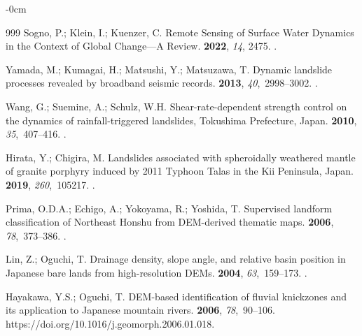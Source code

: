 \documentclass[land,article,accept,pdftex,moreauthors]{Definitions/mdpi}
\begin{document}
\begin{adjustwidth}{-\extralength}{0cm}
\begin{thebibliography}{999}
Sogno, P.; Klein, I.; Kuenzer, C.
\newblock Remote Sensing of Surface Water Dynamics in the Context of Global
  Change---A Review.
 {\bf 2022}, {\em 14}, 2475.
.

Yamada, M.; Kumagai, H.; Matsushi, Y.; Matsuzawa, T.
\newblock Dynamic landslide processes revealed by broadband seismic records.
 {\bf 2013}, {\em 40},~2998--3002.
.

Wang, G.; Suemine, A.; Schulz, W.H.
\newblock Shear-rate-dependent strength control on the dynamics of
  rainfall-triggered landslides, Tokushima Prefecture, Japan.
 {\bf 2010}, {\em
  35},~407--416.
.

Hirata, Y.; Chigira, M.
\newblock Landslides associated with spheroidally weathered mantle of granite
  porphyry induced by 2011 Typhoon Talas in the Kii Peninsula, Japan.
 {\bf 2019}, {\em 260},~105217.
.

Prima, O.D.A.; Echigo, A.; Yokoyama, R.; Yoshida, T.
\newblock Supervised landform classification of Northeast Honshu from
  DEM-derived thematic maps.
 {\bf 2006}, {\em 78},~373--386.
.

Lin, Z.; Oguchi, T.
\newblock Drainage density, slope angle, and relative basin position in
  Japanese bare lands from high-resolution DEMs.
 {\bf 2004}, {\em 63},~159--173.
.

Hayakawa, Y.S.; Oguchi, T.
\newblock DEM-based identification of fluvial knickzones and its application to
  Japanese mountain rivers.
 {\bf 2006}, {\em 78},~90--106.
  {{https://doi.org/10.1016/j.geomorph.2006.01.018}}.

\end{thebibliography}

\PublishersNote{}
\end{adjustwidth}
\end{document}
